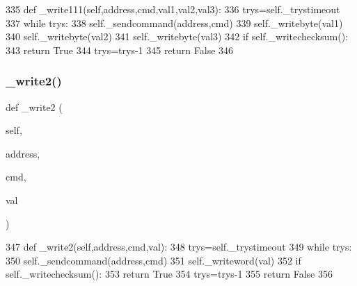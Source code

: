 \begin{DoxyCode}
335     \textcolor{keyword}{def }\_write111(self,address,cmd,val1,val2,val3):
336         trys=self.\_trystimeout
337         \textcolor{keywordflow}{while} trys:
338             self.\_sendcommand(address,cmd)
339             self.\_writebyte(val1)
340             self.\_writebyte(val2)
341             self.\_writebyte(val3)
342             \textcolor{keywordflow}{if} self.\_writechecksum():
343                 \textcolor{keywordflow}{return} \textcolor{keyword}{True}
344             trys=trys-1
345         \textcolor{keywordflow}{return} \textcolor{keyword}{False}
346 
\end{DoxyCode}
\mbox{\label{classtoxic__hardware_1_1roboclaw__3_1_1Roboclaw_a88de3e54ecc50437eb3799d53d4aba3f}} 
\subsubsection{\texorpdfstring{\+\_\+write2()}{\_write2()}}
{\footnotesize\ttfamily def \+\_\+write2 (\begin{DoxyParamCaption}\item[{}]{self,  }\item[{}]{address,  }\item[{}]{cmd,  }\item[{}]{val }\end{DoxyParamCaption})\hspace{0.3cm}{\ttfamily [private]}}


\begin{DoxyCode}
347     \textcolor{keyword}{def }\_write2(self,address,cmd,val):
348         trys=self.\_trystimeout
349         \textcolor{keywordflow}{while} trys:
350             self.\_sendcommand(address,cmd)
351             self.\_writeword(val)
352             \textcolor{keywordflow}{if} self.\_writechecksum():
353                 \textcolor{keywordflow}{return} \textcolor{keyword}{True}
354             trys=trys-1
355         \textcolor{keywordflow}{return} \textcolor{keyword}{False}
356 
\end{DoxyCode}
\mbox{\label{classtoxic__hardware_1_1roboclaw__3_1_1Roboclaw_ae4eb5de67308bec37b6fe995cb88a091}} 
